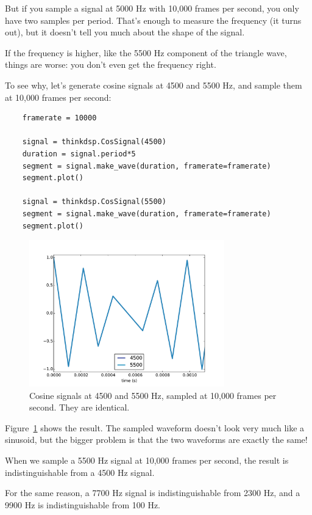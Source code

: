 \documentclass[12pt]{book}
\begin{document}
But if you sample a signal at 5000 Hz with 10,000 frames per second,
you only have two samples per period.  That's enough to measure the
frequency (it turns out), but it doesn't tell you much about
the shape of the signal.

If the frequency is higher, like the 5500 Hz component of the
triangle wave, things are worse: you don't even get the
frequency right.

To see why, let's generate cosine signals at 4500 and 5500 Hz,
and sample them at 10,000 frames per second:

\begin{verbatim}
    framerate = 10000

    signal = thinkdsp.CosSignal(4500)
    duration = signal.period*5
    segment = signal.make_wave(duration, framerate=framerate)
    segment.plot()

    signal = thinkdsp.CosSignal(5500)
    segment = signal.make_wave(duration, framerate=framerate)
    segment.plot()
\end{verbatim}

\begin{figure}
\centerline{\includegraphics[height=2.5in]{figs/aliasing-3.pdf}}
\caption{Cosine signals at 4500 and 5500 Hz, sampled at 10,000 frames
per second.  They are identical.}
\label{fig.aliasing-3}
\end{figure}

Figure~\ref{fig.aliasing-3} shows the result.  The
sampled waveform doesn't look very much like a sinusoid, but the
bigger problem is that the two waveforms are exactly the same!

When we sample a 5500 Hz signal at 10,000 frames per second, the
result is indistinguishable from a 4500 Hz signal.

For the same reason, a 7700 Hz signal is indistinguishable
from 2300 Hz, and a 9900 Hz is indistinguishable from 100 Hz.
\end{document}
